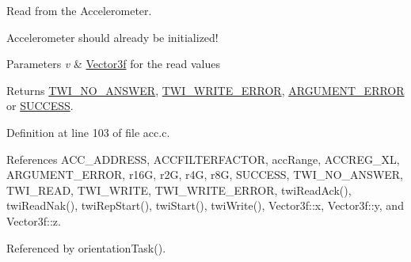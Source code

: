 Read from the Accelerometer. 

Accelerometer should already be initialized! 
\begin{DoxyParams}{Parameters}
{\em v} & \hyperlink{struct_vector3f}{Vector3f} for the read values \\
\hline
\end{DoxyParams}
\begin{DoxyReturn}{Returns}
\hyperlink{group__error_gga2c3e4bb40f36b262a5214e2da2bca9c5a04d5943ba652af2205c88b247e0c659c}{T\-W\-I\-\_\-\-N\-O\-\_\-\-A\-N\-S\-W\-E\-R}, \hyperlink{group__error_gga2c3e4bb40f36b262a5214e2da2bca9c5ac0e3b3463dcaf220e54794b4711708c9}{T\-W\-I\-\_\-\-W\-R\-I\-T\-E\-\_\-\-E\-R\-R\-O\-R}, \hyperlink{group__error_gga2c3e4bb40f36b262a5214e2da2bca9c5a49ccf277a69dd938c591928aa27c66cc}{A\-R\-G\-U\-M\-E\-N\-T\-\_\-\-E\-R\-R\-O\-R} or \hyperlink{group__error_gga2c3e4bb40f36b262a5214e2da2bca9c5ac7f69f7c9e5aea9b8f54cf02870e2bf8}{S\-U\-C\-C\-E\-S\-S}. 
\end{DoxyReturn}


Definition at line 103 of file acc.\-c.



References A\-C\-C\-\_\-\-A\-D\-D\-R\-E\-S\-S, A\-C\-C\-F\-I\-L\-T\-E\-R\-F\-A\-C\-T\-O\-R, acc\-Range, A\-C\-C\-R\-E\-G\-\_\-\-X\-L, A\-R\-G\-U\-M\-E\-N\-T\-\_\-\-E\-R\-R\-O\-R, r16\-G, r2\-G, r4\-G, r8\-G, S\-U\-C\-C\-E\-S\-S, T\-W\-I\-\_\-\-N\-O\-\_\-\-A\-N\-S\-W\-E\-R, T\-W\-I\-\_\-\-R\-E\-A\-D, T\-W\-I\-\_\-\-W\-R\-I\-T\-E, T\-W\-I\-\_\-\-W\-R\-I\-T\-E\-\_\-\-E\-R\-R\-O\-R, twi\-Read\-Ack(), twi\-Read\-Nak(), twi\-Rep\-Start(), twi\-Start(), twi\-Write(), Vector3f\-::x, Vector3f\-::y, and Vector3f\-::z.



Referenced by orientation\-Task().


